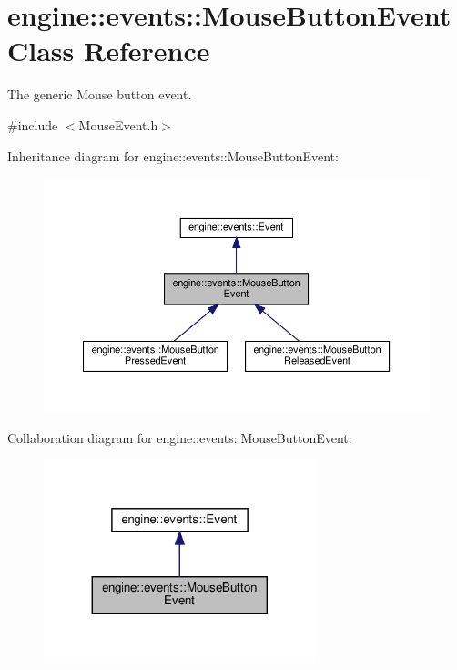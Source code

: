 \hypertarget{classengine_1_1events_1_1MouseButtonEvent}{}\section{engine\+:\+:events\+:\+:Mouse\+Button\+Event Class Reference}
\label{classengine_1_1events_1_1MouseButtonEvent}


The generic Mouse button event.  




{\ttfamily \#include $<$Mouse\+Event.\+h$>$}



Inheritance diagram for engine\+:\+:events\+:\+:Mouse\+Button\+Event\+:
\nopagebreak
\begin{figure}[H]
\begin{center}
\leavevmode
\includegraphics[width=350pt]{classengine_1_1events_1_1MouseButtonEvent__inherit__graph}
\end{center}
\end{figure}


Collaboration diagram for engine\+:\+:events\+:\+:Mouse\+Button\+Event\+:\nopagebreak
\begin{figure}[H]
\begin{center}
\leavevmode
\includegraphics[width=224pt]{classengine_1_1events_1_1MouseButtonEvent__coll__graph}
\end{center}
\end{figure}
